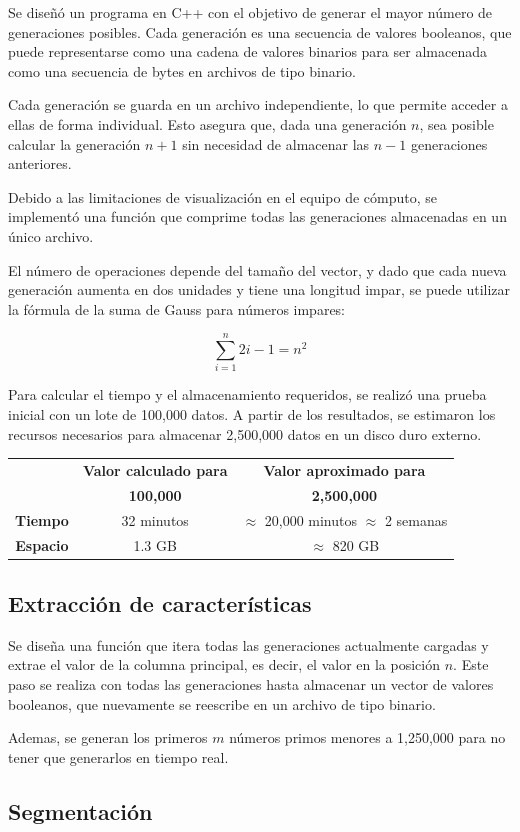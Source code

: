\documentclass[12pt,twoside]{article}
\begin{document}
	Se diseñó un programa en C++ con el objetivo de generar el mayor número de generaciones posibles. Cada generación es una secuencia de valores booleanos, que puede representarse como una cadena de valores binarios para ser almacenada como una secuencia de bytes en archivos de tipo binario.
	
	Cada generación se guarda en un archivo independiente, lo que permite acceder a ellas de forma individual. Esto asegura que, dada una generación $n$, sea posible calcular la generación $n+1$ sin necesidad de almacenar las $n-1$ generaciones anteriores.
	
	Debido a las limitaciones de visualización en el equipo de cómputo, se implementó una función que comprime todas las generaciones almacenadas en un único archivo.
	
	El número de operaciones depende del tamaño del vector, y dado que cada nueva generación aumenta en dos unidades y tiene una longitud impar, se puede utilizar la fórmula de la suma de Gauss para números impares:
	
	\begin{equation*}
		\sum_{i = 1}^{n} 2i - 1 = n^2
	\end{equation*}
	
	Para calcular el tiempo y el almacenamiento requeridos, se realizó una prueba inicial con un lote de 100,000 datos. A partir de los resultados, se estimaron los recursos necesarios para almacenar 2,500,000 datos en un disco duro externo.
	
	\begin{center}
		\begin{tabular}{|c|c|c|}
			\hline
			& \textbf{Valor calculado para} & \textbf{Valor aproximado para} \\
			& \textbf{100,000} & \textbf{2,500,000} \\
			\hline
			\textbf{Tiempo} & 32 minutos & $\approx$ 20,000 minutos $\approx$ 2 semanas \\
			\hline
			\textbf{Espacio} & 1.3 GB & $\approx$ 820 GB \\
			\hline
		\end{tabular}
	\end{center}
	
	\subsection{Extracción de características}
	
	Se diseña una función que itera todas las generaciones actualmente cargadas y extrae el valor de la columna principal, es decir, el valor en la posición $n$. Este paso se realiza con todas las generaciones hasta almacenar un vector de valores booleanos, que nuevamente se reescribe en un archivo de tipo binario.
	
	Ademas, se generan los primeros $m$ números primos menores a 1,250,000 para no tener que generarlos en tiempo real.
	
	\subsection{Segmentación}
	
	
	\clearpage
	\begin{thebibliography}{99}
		\bibitem{}
		
	
		
	\end{thebibliography}
	
\end{document}
